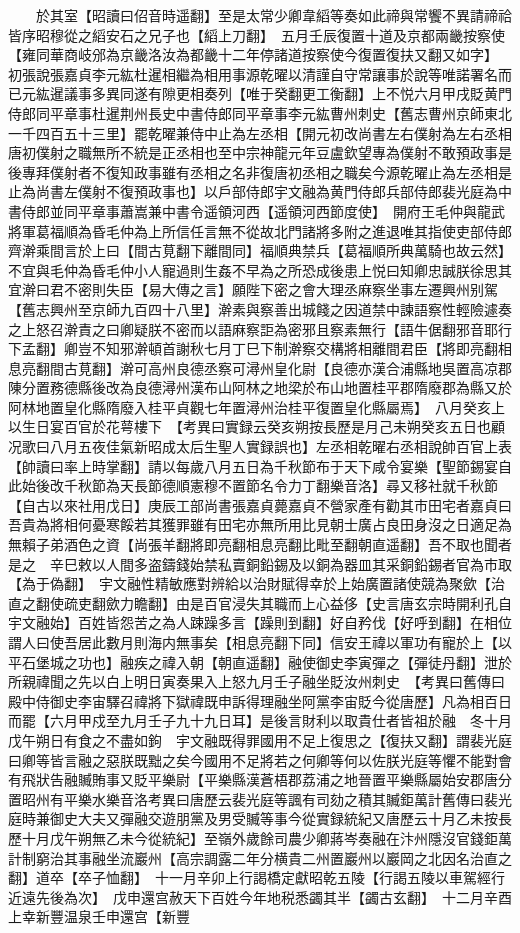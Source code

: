 　　於其室【昭讀曰佋音時遥翻】至是太常少卿韋縚等奏如此禘與常饗不異請禘祫皆序昭穆從之縚安石之兄子也【縚上刀翻】　五月壬辰復置十道及京都兩畿按察使【雍同華商岐邠為京畿洛汝為都畿十二年停諸道按察使今復置復扶又翻又如字】　初張說張嘉貞李元紘杜暹相繼為相用事源乾曜以清謹自守常讓事於說等唯諾署名而已元紘暹議事多異同遂有隙更相奏列【唯于癸翻更工衡翻】上不悦六月甲戌貶黄門侍郎同平章事杜暹荆州長史中書侍郎同平章事李元紘曹州刺史【舊志曹州京師東北一千四百五十三里】罷乾曜兼侍中止為左丞相【開元初改尚書左右僕射為左右丞相唐初僕射之職無所不統是正丞相也至中宗神龍元年豆盧欽望專為僕射不敢預政事是後專拜僕射者不復知政事雖有丞相之名非復唐初丞相之職矣今源乾曜止為左丞相是止為尚書左僕射不復預政事也】以戶部侍郎宇文融為黄門侍郎兵部侍郎裴光庭為中書侍郎並同平章事蕭嵩兼中書令遥領河西【遥領河西節度使】　開府王毛仲與龍武將軍葛福順為昏毛仲為上所信任言無不從故北門諸將多附之進退唯其指使吏部侍郎齊澣乘間言於上曰【間古莧翻下離間同】福順典禁兵【葛福順所典萬騎也故云然】不宜與毛仲為昏毛仲小人寵過則生姦不早為之所恐成後患上悦曰知卿忠誠朕徐思其宜澣曰君不密則失臣【易大傳之言】願陛下密之會大理丞麻察坐事左遷興州别駕【舊志興州至京師九百四十八里】澣素與察善出城餞之因道禁中諫語察性輕險遽奏之上怒召澣責之曰卿疑朕不密而以語麻察詎為密邪且察素無行【語牛倨翻邪音耶行下孟翻】卿豈不知邪澣頓首謝秋七月丁巳下制澣察交構將相離間君臣【將即亮翻相息亮翻間古莧翻】澣可高州良德丞察可潯州皇化尉【良德亦漢合浦縣地吳置高凉郡陳分置務德縣後改為良德潯州漢布山阿林之地梁於布山地置桂平郡隋廢郡為縣又於阿林地置皇化縣隋廢入桂平貞觀七年置潯州治桂平復置皇化縣屬焉】　八月癸亥上以生日宴百官於花萼樓下　【考異曰實録云癸亥朔按長歷是月己未朔癸亥五日也顧况歌曰八月五夜佳氣新昭成太后生聖人實録誤也】左丞相乾曜右丞相說帥百官上表【帥讀曰率上時掌翻】請以每歲八月五日為千秋節布于天下咸令宴樂【聖節錫宴自此始後改千秋節為天長節德順憲穆不置節名令力丁翻樂音洛】尋又移社就千秋節【自古以來社用戊日】庚辰工部尚書張嘉貞薨嘉貞不營家產有勸其市田宅者嘉貞曰吾貴為將相何憂寒餒若其獲罪雖有田宅亦無所用比見朝士廣占良田身沒之日適足為無賴子弟酒色之資【尚張羊翻將即亮翻相息亮翻比毗至翻朝直遥翻】吾不取也聞者是之　辛巳敕以人間多盗鑄錢始禁私賣銅鉛錫及以銅為器皿其采銅鉛錫者官為市取【為于偽翻】　宇文融性精敏應對辨給以治財賦得幸於上始廣置諸使競為聚歛【治直之翻使疏吏翻歛力瞻翻】由是百官浸失其職而上心益侈【史言唐玄宗時開利孔自宇文融始】百姓皆怨苦之為人踈躁多言【躁則到翻】好自矜伐【好呼到翻】在相位謂人曰使吾居此數月則海内無事矣【相息亮翻下同】信安王禕以軍功有寵於上【以平石堡城之功也】融疾之禕入朝【朝直遥翻】融使御史李寅彈之【彈徒丹翻】泄於所親禕聞之先以白上明日寅奏果入上怒九月壬子融坐貶汝州刺史　【考異曰舊傳曰殿中侍御史李宙驛召禕將下獄禕既申訴得理融坐阿黨李宙貶今從唐歷】凡為相百日而罷【六月甲戍至九月壬子九十九日耳】是後言財利以取貴仕者皆祖於融　冬十月戊午朔日有食之不盡如鉤　宇文融既得罪國用不足上復思之【復扶又翻】謂裴光庭曰卿等皆言融之惡朕既黜之矣今國用不足將若之何卿等何以佐朕光庭等懼不能對會有飛狀告融贓賄事又貶平樂尉【平樂縣漢蒼梧郡荔浦之地晉置平樂縣屬始安郡唐分置昭州有平樂水樂音洛考異曰唐歷云裴光庭等諷有司劾之積其贓鉅萬計舊傳曰裴光庭時兼御史大夫又彈融交遊朋黨及男受贓等事今從實録統紀又唐歷云十月乙未按長歷十月戊午朔無乙未今從統紀】至嶺外歲餘司農少卿蔣岑奏融在汴州隱沒官錢鉅萬計制窮治其事融坐流巖州【高宗調露二年分横貴二州置巖州以巖岡之北因名治直之翻】道卒【卒子恤翻】　十一月辛卯上行謁橋定獻昭乾五陵【行謁五陵以車駕經行近遠先後為次】　戊申還宫赦天下百姓今年地税悉蠲其半【蠲古玄翻】　十二月辛酉上幸新豐温泉壬申還宫【新豐